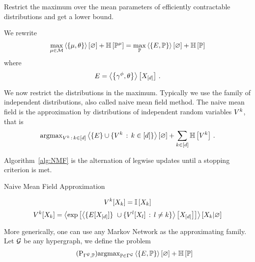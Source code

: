 Restrict the maximum over the mean parameters of efficiently contractable distributions and get a lower bound.

We rewrite 
\begin{align*}
	\max_{\mu\in\mathcal{M}}  \left\langle \left\{\mu,\theta\right\}\right\rangle \left[ \varnothing \right] + \mathbb{H}\left[\mathbb{P}^{\mu}\right] 
	=
	\max_{\mathbb{P}} \left\langle \left\{E,\mathbb{P}\right\}\right\rangle \left[ \varnothing \right] + \mathbb{H}\left[\mathbb{P}\right]
\end{align*}
where
	\[ E = \left\langle \left\{\gamma^{\phi},\theta\right\}\right\rangle \left[ X_{[d]} \right] \, . \]

We now restrict the distributions in the maximum.
Typically we use the family of independent distributions, also called naive mean field method.
The naive mean field is the approximation by distributions of independent random variables $V^{k}$, that is
\begin{align*}
	\mathrm{argmax}_{V^{k} \, : \, k\in[d]} \left\langle \{E\} \cup \{V^{k} \, : \, k\in[d]\}\right\rangle \left[ \varnothing \right]
	+ \sum_{k\in[d]} \mathbb{H}\left[V^{k}\right] \, . 
\end{align*}

Algorithm~\ref{alg:NMF} is the alternation of legwise updates until a stopping criterion is met.

\begin{algorithm}[h!]
\caption{Naive Mean Field Approximation}\label{alg:NMF}
\begin{algorithmic}
\For{$\catenumeratorin$}
	\State 
		\[ V^{k}[X_{k}] = \mathbb{I}\left[X_{k}\right]  \]
\EndFor
{}
	\For{$\catenumeratorin$}
		\State 
			\[ \legcoreofat{\catenumerator}{\catvariableof{\catenumerator}} 
			= \normationof{ \expof{ \contractionof{ \{\energytensor[\shortcatvariables] \} \cup
				\{\legcoreofat{\secatomenumerator}{\catvariableof{\secatomenumerator}} \, : \, \secatomenumerator\neq\catenumerator\} }{\shortcatvariables} }
			}{\catvariableof{\catenumerator}} \]
\EndFor
\EndWhile
\end{algorithmic}
\end{algorithm}


More generically, one can use any Markov Network as the approximating family. %
Let $\mathcal{G}$ be any hypergraph, we define the problem
\begin{align}\tag{$\mathrm{P}_{\mnexpfamily, \probtensor}$}\label{prob:structuredApproximation}
	\argmax_{\probtensor\in \mnexpfamily} \sbcontraction{\energytensor,\probtensor} + \sentropyof{\probtensor}
\end{align}


